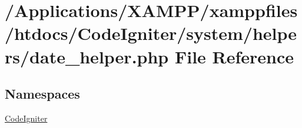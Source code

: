 \hypertarget{date__helper_8php}{}\section{/\+Applications/\+X\+A\+M\+P\+P/xamppfiles/htdocs/\+Code\+Igniter/system/helpers/date\+\_\+helper.php File Reference}
\label{date__helper_8php}
\subsection*{Namespaces}
\begin{DoxyCompactItemize}
\item 
 \mbox{\hyperlink{namespace_code_igniter}{Code\+Igniter}}
\end{DoxyCompactItemize}

